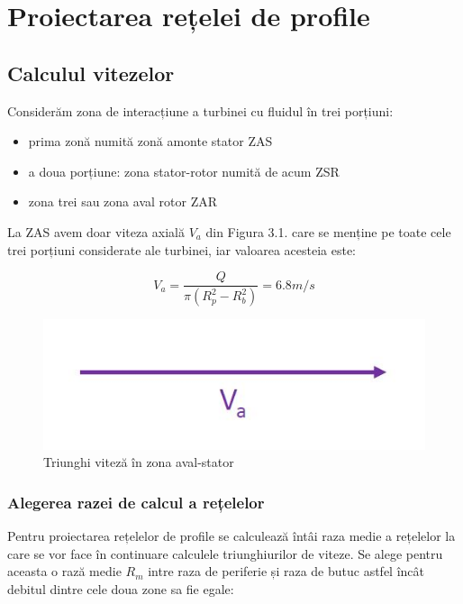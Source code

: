 \chapter{Proiectarea rețelei de profile} \label{chapter:proiectarea}

\section{Calculul vitezelor}

Considerăm zona de interacțiune a turbinei cu fluidul în trei porțiuni:
\begin{itemize}
	\item prima zonă numită zonă amonte stator ZAS
	\item a doua porțiune: zona stator-rotor numită de acum ZSR
	\item zona trei sau zona aval rotor ZAR
\end{itemize}

La ZAS avem doar viteza axială $V_{a}$ din Figura 3.1. care se menține pe toate cele trei porțiuni considerate ale turbinei, iar valoarea acesteia este:

\begin{equation}
V_a=\frac{Q}{\pi(R_{p}^2-R_{b}^2)}=6.8\si{m/s}
\end{equation}

\begin{figure}[h!]
	\centering
	\includegraphics[scale=0.4]{figures/triunghi_viteza_ZAS.jpg}
	\caption{Triunghi viteză în zona aval-stator}
	\label{Triunghi viteză în zona aval-stator}
\end{figure}

\subsection{Alegerea razei de calcul a rețelelor}

Pentru proiectarea rețelelor de profile se calculează întâi raza medie a rețelelor la care se vor face în continuare calculele triunghiurilor de viteze. Se alege pentru aceasta o rază medie $R_m$ intre raza de periferie și raza de butuc astfel încât debitul dintre cele doua zone sa fie egale:

